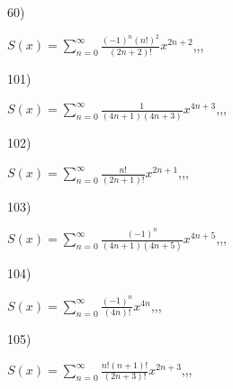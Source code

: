 \documentclass[11pt, ukrainian]{article}
\begin{document}
\par
\vspace{0.9cm}
60) \space 
{%
{$S(x)=\sum\limits_{n=0}^{\infty}{\frac{{(-1)^n}{(n!)^2}}{(2n+2)!}}{x^{{2n+2}}}$},,, \par \smallskip  
}
\par
\newpage
101) \space 
{%
{$S(x)=\sum\limits_{n=0}^{\infty}{\frac{1}{(4n+1)(4n+3)}}{x^{{4n+3}}}$},,, \par \smallskip  
}
\par
\vspace{0.9cm}
102) \space 
{%
{$S(x)=\sum\limits_{n=0}^{\infty}{\frac{n!}{(2n+1)!}}{x^{{2n+1}}}$},,, \par \smallskip  
}
\par
\vspace{0.9cm}
103) \space 
{%
{$S(x)=\sum\limits_{n=0}^{\infty}{\frac{(-1)^n}{(4n+1)(4n+5)}}{x^{{4n+5}}}$},,, \par \smallskip  
}
\par
\vspace{0.9cm}
104) \space 
{%
{$S(x)=\sum\limits_{n=0}^{\infty}{\frac{(-1)^n}{(4n)!}}{x^{{4n}}}$},,, \par \smallskip  
}
\par
\vspace{0.9cm}
105) \space 
{%
{$S(x)=\sum\limits_{n=0}^{\infty}{\frac{n!(n+1)!}{(2n+3)!}}{x^{{2n+3}}}$},,, \par \smallskip  
}
\end{document}
